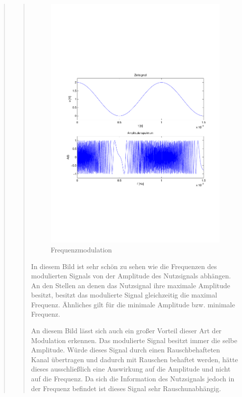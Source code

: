 \begin{quote}
\begin{quote}
        \begin{figure}[H]
        \centering
            \includegraphics[scale=0.5, trim = 1.5cm 6.5cm 1cm 8cm, clip]{./Bilder/Frequenzmodulation}
                \caption{Frequenzmodulation}
        \end{figure}
        
        In diesem Bild ist sehr schön zu sehen wie die Frequenzen des modulierten Signals von der Amplitude des
        Nutzsignals abhängen. An den Stellen an denen das Nutzsignal ihre maximale Amplitude besitzt, besitzt das
        modulierte Signal gleichzeitig die maximal Frequenz. Ähnliches gilt für die minimale Amplitude bzw. minimale
        Frequenz.\vspace{1em}
        
        An diesem Bild lässt sich auch ein großer Vorteil dieser Art der Modulation erkennen. Das modulierte Signal
        besitzt immer die selbe Amplitude. Würde dieses Signal durch einen Rauschbehafteten Kanal übertragen und dadurch
        mit Rauschen behaftet werden, hätte dieses ausschließlich eine Auswirkung auf die Amplitude und nicht auf die
        Frequenz. Da sich die Information des Nutzsignals jedoch in der Frequenz befindet ist dieses Signal sehr
        Rauschunabhängig.\vspace{1em}
        

\end{quote}
\end{quote}

